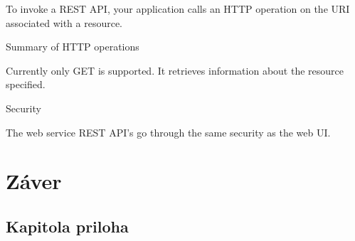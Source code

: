 \documentclass[11pt,final,oneside]{fithesis}
\begin{document}
To invoke a REST API, your application calls an HTTP operation on the URI associated with a resource.

Summary of HTTP operations

Currently only GET is supported. It retrieves information about the resource specified.

Security

The web service REST API’s go through the same security as the web UI. 

\cite{18}



\chapter{Záver}


\nocite{*}


\begin{appendix}
\chapter{Kapitola priloha}
\end{appendix}
\end{document}
